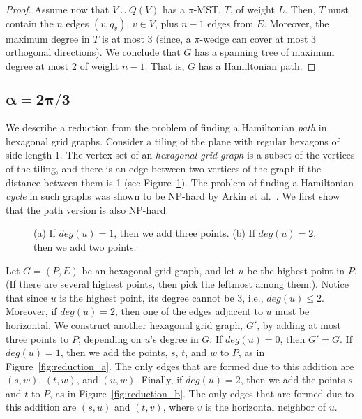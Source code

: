 \documentclass[11pt]{article}
\begin{document}
{\begin{proof}
Assume now that $V \cup Q(V)$ has a $\pi$-MST, $T$, of weight $L$. Then, $T$ must contain the $n$ edges $(v,q_v)$, $v \in V$, plus $n-1$ edges from $E$. Moreover, the maximum degree in $T$ is at most 3 (since, a $\pi$-wedge can cover at most 3 orthogonal directions). We conclude that $G$ has a spanning tree of maximum degree at most 2 of weight $n-1$. That is, $G$ has a Hamiltonian path.
\end{proof}


\vspace{-3mm}
\subsection{$\boldsymbol{\alpha=2\pi/3}$}

We describe a reduction from the problem of finding a Hamiltonian {\em path} in hexagonal grid graphs. 
Consider a tiling of the plane with regular hexagons of side length 1. The vertex set of an {\em hexagonal grid graph} is a subset of the vertices of the tiling, and there is an edge between two vertices of the graph if the distance between them is 1 (see Figure~\ref{fig:reduction120}). 
The problem of finding a Hamiltonian {\em cycle} in such graphs was shown to be NP-hard by Arkin et al.~\cite{AFIMMRPRX09}.
We first show that the path version is also NP-hard.

\begin{figure}[htb]
\centering
	\hspace{.75cm}
 	\caption{(a) If $deg(u)=1$, then we add three points. (b) If $deg(u)=2$, then we add two points.} \label{fig:reduction120}	
\end{figure} 
 
Let $G=(P,E)$ be an hexagonal grid graph, and let $u$ be the highest point in $P$. (If there are several highest points, then pick the leftmost among them.). Notice that since $u$ is the highest point, its degree cannot be 3, i.e., $deg(u) \le 2$. 
Moreover, if $deg(u)=2$, then one of the edges adjacent to $u$ must be horizontal.
We construct another hexagonal grid graph, $G'$, by adding at most three points to $P$, depending on $u$'s degree in $G$.
If $deg(u)=0$, then $G' = G$.
If $deg(u)=1$, then we add the points, $s$, $t$, and $w$ to $P$, as in Figure~\ref{fig:reduction_a}. The only edges that are formed due to this addition are $(s,w)$, $(t,w)$, and $(u,w)$.
Finally, if $deg(u)=2$, then  we add the points $s$ and $t$ to $P$, as in Figure~\ref{fig:reduction_b}. The only edges that are formed due to this addition are $(s,u)$ and $(t,v)$, where $v$ is the horizontal neighbor of $u$.

}
\end{document}
